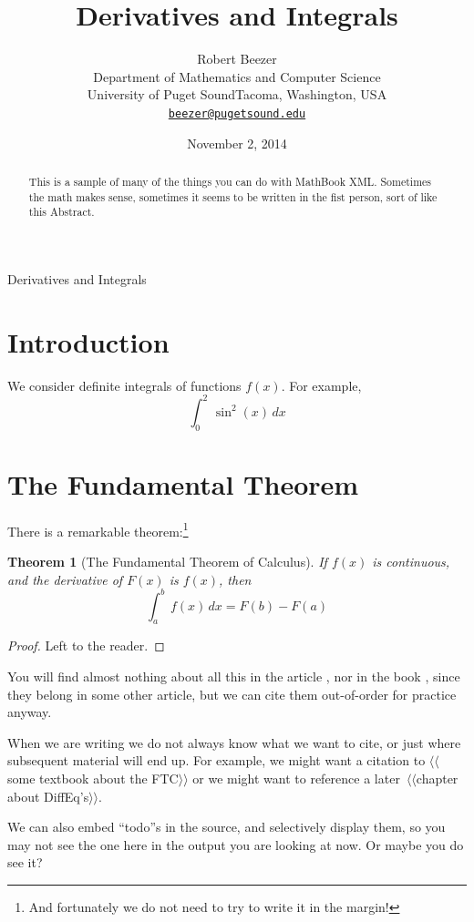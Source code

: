 \documentclass[10pt,]{article}
\title{Derivatives and Integrals}
\author{Robert Beezer\\
Department of Mathematics and Computer Science\\
University of Puget Sound\newline Tacoma, Washington, USA\\
\href{mailto:beezer@pugetsound.edu}{\nolinkurl{beezer@pugetsound.edu}}
}
\date{November 2, 2014}
\theoremstyle{plain}
\newtheorem{theorem}{Theorem}[section]
\theoremstyle{definition}
\newcommand{\definiteintegral}[4]{\int_{#1}^{#2}\,#3\,d#4}
\begin{document}
%
\maketitle
%
\thispagestyle{empty}
%
\begin{abstract}
This is a sample of many of the things you can do with MathBook XML.  Sometimes the math makes sense, sometimes it seems to be written in the fist person, sort of like this Abstract.
%
\end{abstract}
%
Derivatives and Integrals\typeout{************************************************}
\typeout{************************************************}
%
\section{Introduction}\label{section-1}
%
We consider definite integrals of functions $f(x)$.  For example, \begin{displaymath}\definiteintegral{0}{2}{\sin^2(x)}{x}\end{displaymath}
%
\typeout{************************************************}
\typeout{************************************************}
%
\section{The Fundamental Theorem}\label{section-2}
%
There is a remarkable theorem:\footnote{And fortunately we do not need to try to write it in the margin!}
%
\begin{theorem}[The Fundamental Theorem of Calculus]\label{theorem-1}
If $f(x)$ is continuous, and the derivative of $F(x)$ is $f(x)$, then \begin{displaymath}\definiteintegral{a}{b}{f(x)}{x}=F(b)-F(a)\end{displaymath}
%
\end{theorem}
%
\begin{proof}
Left to the reader.
%
\end{proof}
%
\par You will find almost nothing about all this in the article \cite{bib-fundamental}, nor in the book \cite{bib-fcla}, since they belong in some other article, but we can cite them out-of-order for practice anyway.
%
\par When we are writing we do not always know what we want to cite, or just where subsequent material will end up.  For example, we might want a citation to $\langle\langle$some textbook about the FTC$\rangle\rangle$ or we might want to reference a later~$\langle\langle$chapter about DiffEq's$\rangle\rangle$.
%
\par We can also embed ``todo''s in the source, and selectively display them, so you may not see the one here in the output you are looking at now.  Or maybe you do see it?
%
\typeout{************************************************}
\typeout{************************************************}
%
\end{document}
